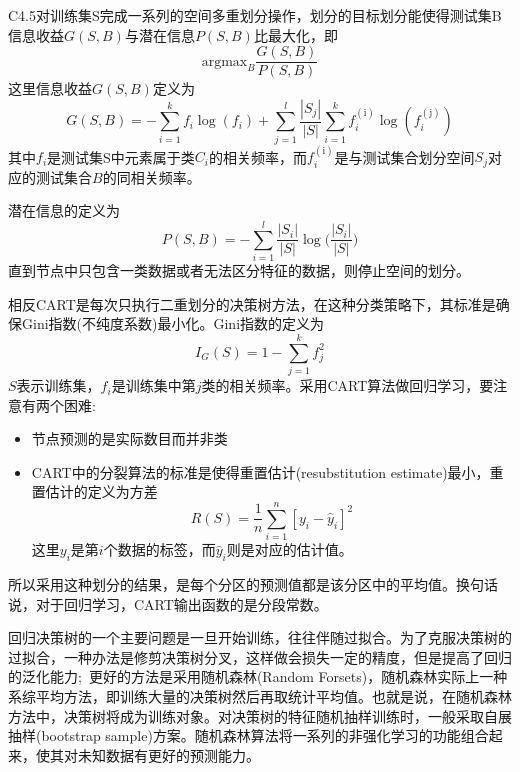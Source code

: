 \textrm{C4.5}对训练集\textrm{S}完成一系列的空间多重划分操作，划分的目标划分能使得测试集\textrm{B}信息收益$G(S,B)$与潜在信息$P(S,B)$比最大化，即
\begin{displaymath}
	\mathrm{argmax}_B\dfrac{G(S,B)}{P(S,B)}
\end{displaymath}
这里信息收益$G(S,B)$定义为
\begin{displaymath}
	G(S,B)=-\sum_{i=1}^kf_i\log(f_i)+\sum_{j=1}^l\dfrac{|S_j|}{|S|}\sum_{i=1}^kf_i^{(\mathrm{i})}\log(f_i^{(\mathrm{j})})
\end{displaymath}
其中$f_i$是测试集\textrm{S}中元素属于类$C_i$的相关频率，而$f_i^{(\mathrm{i})}$是与测试集合划分空间$S_j$对应的测试集合$B$的同相关频率。

潜在信息的定义为
\begin{displaymath}
	P(S,B)=-\sum_{i=1}^l\dfrac{|S_i|}{|S|}\log\bigg(\dfrac{|S_i|}{|S|}\bigg)
\end{displaymath}
直到节点中只包含一类数据或者无法区分特征的数据，则停止空间的划分。

相反\textrm{CART}是每次只执行二重划分的决策树方法，在这种分类策略下，其标准是确保\textrm{Gini}指数(不纯度系数)最小化。\textrm{Gini}指数的定义为
\begin{displaymath}
	I_G(S)=1-\sum_{j=1}^kf_j^2
\end{displaymath}
$S$表示训练集，$f_i$是训练集中第$j$类的相关频率。采用\textrm{CART}算法做回归学习，要注意有两个困难:
\begin{itemize}
	\item 节点预测的是实际数目而并非类
	\item \textrm{CART}中的分裂算法的标准是使得重置估计\textrm{(resubstitution estimate)}最小，重置估计的定义为方差
		\begin{displaymath}
			R(S)=\dfrac1n\sum_{i=1}^n[y_i-\hat{y}_i]^2
		\end{displaymath}
		这里$y_i$是第$i$个数据的标签，而$\hat{y}_i$则是对应的估计值。
\end{itemize}
所以采用这种划分的结果，是每个分区的预测值都是该分区中的平均值。换句话说，对于回归学习，\textrm{CART}输出函数的是分段常数。

回归决策树的一个主要问题是一旦开始训练，往往伴随过拟合。为了克服决策树的过拟合，一种办法是修剪决策树分叉，这样做会损失一定的精度，但是提高了回归的泛化能力;~更好的方法是采用随机森林\textrm{(Random Forsets)}，随机森林实际上一种系综平均方法，即训练大量的决策树然后再取统计平均值\cite{ML45-5_2001}。也就是说，在随机森林方法中，决策树将成为训练对象。对决策树的特征随机抽样训练时，一般采取自展抽样\textrm{(bootstrap sample)}方案。随机森林算法将一系列的非强化学习的功能组合起来，使其对未知数据有更好的预测能力。

